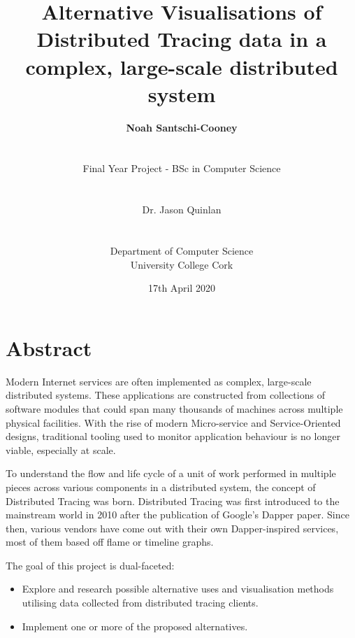 \documentclass[12pt,pdftex,titlepage]{report}
\author{\textbf{Noah Santschi-Cooney}
\\\\\\\small{Final Year Project - BSc in Computer Science}
\\\\\\\small{Dr. Jason Quinlan}
\\\\\\\small{Department of Computer Science}
\\\small{University College Cork}}
\title{\textbf{Alternative Visualisations of Distributed Tracing data in a complex, large-scale distributed system}}
\date{\vfill\small{17th April 2020}}
\begin{document}
    \maketitle    

    \chapter*{Abstract}
        \begin{spacing}{1.0}
            Modern Internet services are often implemented as complex, large-scale distributed systems. These applications are constructed from collections 
            of software modules that could span many thousands of machines across multiple physical facilities. With the rise of modern Micro-service and 
            Service-Oriented designs, traditional tooling used to monitor application behaviour is no longer viable, especially at scale. 
            
            To understand the flow and life cycle of a unit of work performed in multiple pieces across various components in a distributed system, the concept of 
            Distributed Tracing was born. Distributed Tracing was first introduced to the mainstream world in 2010 after the publication of Google’s Dapper
            paper. Since then, various vendors have come out with their own Dapper-inspired services, most of them based off flame or timeline graphs. 
            
            The goal of this project is dual-faceted:
            \begin{itemize}
                \item Explore and research possible alternative uses and visualisation methods utilising data collected from distributed tracing clients.
                \item Implement one or more of the proposed alternatives.
            \end{itemize}
        \end{spacing}
\end{document}
